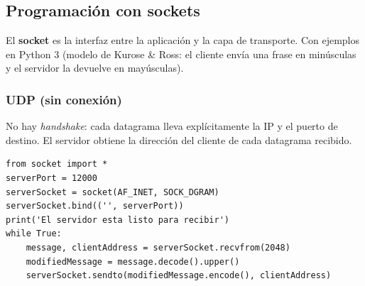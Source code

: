 \documentclass[11pt,a4paper]{article}
\begin{document}
\subsection{Programación con sockets}

El \textbf{socket} es la interfaz entre la aplicación y la capa de transporte. Con ejemplos en Python 3 (modelo de Kurose \& Ross: el cliente envía una frase en minúsculas y el servidor la devuelve en mayúsculas).

\subsubsection{UDP (sin conexión)}

No hay \emph{handshake}: cada datagrama lleva explícitamente la IP y el puerto de destino. El servidor obtiene la dirección del cliente de cada datagrama recibido.

\begin{center}
\end{center}

\begin{lstlisting}[language=pyr,caption={UDPServer.py}]
from socket import *
serverPort = 12000
serverSocket = socket(AF_INET, SOCK_DGRAM)
serverSocket.bind(('', serverPort))
print('El servidor esta listo para recibir')
while True:
    message, clientAddress = serverSocket.recvfrom(2048)
    modifiedMessage = message.decode().upper()
    serverSocket.sendto(modifiedMessage.encode(), clientAddress)
\end{lstlisting}
\end{document}
